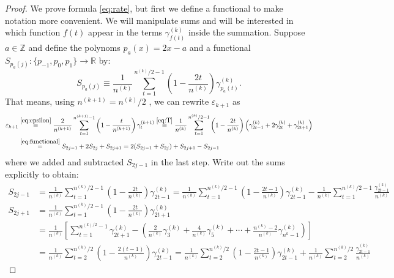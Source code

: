 \documentclass[11pt,english,a4paper]{article}
\begin{document}
\begin{proof}
We prove formula \eqref{eq:rate}, but first we define a functional to make notation more convenient. We will manipulate sums and will be interested in which function $f(t)$ appear in the terms $\gamma^{(k)}_{f(t)}$ inside the summation. Suppose $a \in \mathbb{Z}$ and define the polynoms $p_{a}(x) = 2x-a$ and a functional $S_{p_a(j)} : \{p_{-1},p_{0},p_{1}\} \to \mathbb{R}$ by: 
\begin{equation}
S_{p_a(j)} \equiv \frac{1}{n^{(k)}} \sum_{t=1}^{n^{(k)}/2-1} \left( 1 - \frac{2t}{n^{(k)}} \right) \gamma^{(k)}_{p_a(t)}. \label{eq:functional}
\end{equation}
That means, using $n^{(k+1)} = n^{(k)}/2$ , we can rewrite $\varepsilon_{  k+1}$ as
\begin{align}
\varepsilon_{  k+1} &\stackrel{\eqref{eq:epsilon}}{=} \frac{2}{n^{(k+1)}} \sum_{t=1}^{n^{(k+1)}-1} \left( 1 - \frac{t}{n^{(k+1)}} \right) \gamma^{(k+1)}_t \stackrel{\eqref{eq:T}}{=} \frac{1}{n^{(k)}} \sum_{t=1}^{n^{(k)}/2-1} \left( 1 - \frac{2t}{n^{(k)}} \right) \left( \gamma^{(k)}_{2t - 1} + 2\gamma^{(k)}_{2t} + \gamma^{(k)}_{2t + 1}\right) \nonumber \\
& \stackrel{\eqref{eq:functional}} {=} S_{2j-1} + 2S_{2j} + S_{2j+1} = 2(S_{2j-1} + S_{2j}) + S_{2j+1} - S_{2j-1} \label{eq:epsilonkpp}
\end{align}
where we added and subtracted $S_{2j - 1}$ in the last step. Write out the sums explicitly to obtain:
\begin{align}
S_{2j-1} &= \frac{1}{n^{(k)}} \sum_{t=1}^{n^{(k)}/2-1} \left( 1 - \frac{2t}{n^{(k)}} \right) \gamma^{(k)}_{2t - 1}  = \frac{1}{n^{(k)}}\sum_{t=1}^{n^{(k)}/2-1} \left( 1 - \frac{2t-1}{n^{(k)}}\right) \gamma^{(k)}_{2t - 1} - \frac{1}{n^{(k)}} \sum_{t=1}^{n^{(k)}/2-1} \frac{\gamma^{(k)}_{2t - 1}}{n^{(k)}} \label{eq:sumB}
\\
S_{2j+1} &= \frac{1}{n^{(k)}} \sum_{t=1}^{n^{(k)}/2-1} \left( 1 - \frac{2t}{n^{(k)}} \right) \gamma^{(k)}_{2t + 1} \nonumber  \\
&=  \frac{1}{n^{(k)}} \left[ \sum_{t=1}^{n^{(k)/2}-1}\gamma_{2t+1}^{(k)} - \left(\frac{2}{n^{(k)}} \gamma^{(k)}_{3} + \frac{4}{n^{(k)}} \gamma^{(k)}_{5} + \cdots + \frac{n^{(k)} - 2}{n^{(k)}} \gamma^{(k)}_{n^{k} - 1} \right)\right]\nonumber
 \\
 &= \frac{1}{n^{(k)}}\sum_{t=2}^{n^{(k)}/2} \left( 1 - \frac{2(t-1)}{n^{(k)}} \right) \gamma^{(k)}_{2t-1} = \frac{1}{n^{(k)}} \sum_{t=2}^{n^{(k)}/2} \left( 1 - \frac{2t-1}{n^{(k)}} \right) \gamma^{(k)}_{2t - 1} + \frac{1}{n^{(k)}}\sum_{t=2}^{n^{(k)}/2} \frac{\gamma^{(k)}_{2t - 1}}{n^{(k)}}  \nonumber

\end{align}
\end{proof}
\end{document}
